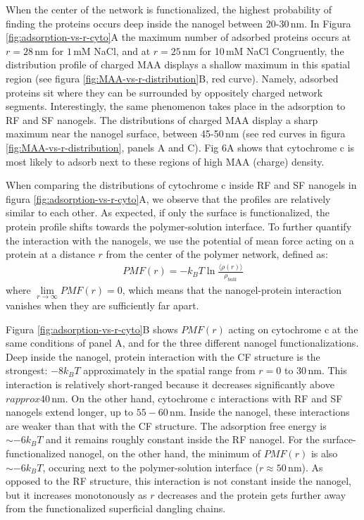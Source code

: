When the center of the network is functionalized, the highest probability of finding the proteins occurs deep inside the nanogel between 20-30\,nm.
In Figura \ref{fig:adsorption-vs-r-cyto}A the maximum number of adsorbed proteins occurs at $r=28$\,nm for $1$\,mM NaCl, and at $r=25$\,nm for 10\,mM NaCl%
Congruently, the distribution profile of charged MAA displays a shallow maximum in this spatial region (see figura \ref{fig:MAA-vs-r-distribution}B, red curve).
Namely, adsorbed proteins sit where they can be surrounded by oppositely charged network segments.
Interestingly, the same phenomenon takes place in the adsorption to RF and SF nanogels.
The distributions of charged MAA display a sharp maximum near the nanogel surface, between 45-50\,nm (see red curves in  figura \ref{fig:MAA-vs-r-distribution}, panels A and C).
Fig 6A shows that cytochrome c is most likely to adsorb next to these  regions of high MAA (charge) density.



When comparing the distributions of cytochrome c inside RF and SF nanogels in figura \ref{fig:adsorption-vs-r-cyto}A, we observe that the profiles are relatively similar to each other.
As expected, if only the surface is functionalized, the protein profile shifts towards the polymer-solution interface.
To further quantify the interaction with the nanogels, we use the potential of mean force acting on a protein at a distance $r$ from the center of the polymer network, defined as:
\begin{align}
   {PMF} (r) = -k_B T \ln \frac{\langle \rho(r)\rangle}{\rho_{bulk}}
\end{align}
where $\lim\limits_{r\to \infty}{PMF}(r)=0$, which means that the nanogel-protein interaction vanishes when they are sufficiently far apart.





Figura \ref{fig:adsorption-vs-r-cyto}B shows ${PMF}(r)$ acting on cytochrome c at the same conditions of panel A, and for the three different nanogel functionalizations.
Deep inside the nanogel, protein interaction with the CF structure is the strongest: $-8k_B T$ approximately in the spatial range from $r=0$ to 30\,nm.
This interaction is relatively short-ranged because it decreases significantly above $r approx 40$\,nm.
On the other hand,  cytochrome c interactions with RF and SF nanogels extend longer, up to $55-60$\,nm.
Inside the nanogel, these interactions are weaker than that with the CF structure.
The adsorption free energy is $\sim -6 k_BT$ and it remains roughly constant inside the RF nanogel.
For the surface-functionalized nanogel, on the other hand, the minimum of ${PMF}(r)$ is also $\sim -6 k_BT$, occuring next to the polymer-solution interface ($r\approx 50$\,nm).
As opposed to the RF structure, this interaction is not constant inside the nanogel, but it increases monotonously as $r$ decreases and the protein gets further away from the functionalized superficial dangling chains.












